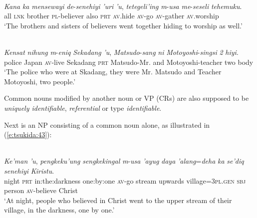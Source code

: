 \documentclass[output=paper
,modfonts
,nonflat]{langsci/langscibook}
\begin{document}
\begin{exe}
	\label{e:tsukida:41}\\
	\gll \textit{Kana} \textit{ka} \textit{mensewayi} \textit{de}-\textit{senehiyi} \textit{'uri} \textit{'u}, \textit{tetegeli'ing}   \textit{m}-\textit{usa}   \textit{me}-\textit{seseli} \textit{tehemuku}.\\
	all \textsc{lnk} brother \textsc{pl}-believer  also \textsc{prt} \textsc{av}.hide \textsc{av}-go \textsc{av}-gather \textsc{av}.worship\\
	\glt ‘The brothers and sisters of believers went together hiding to worship as well.’
\end{exe}

\begin{exe}
	\label{e:tsukida:42}\\
	\gll \textit{Kensat} \textit{nihung} \textit{m}-\textit{eniq}  \textit{Sekadang}  \textit{'u},  \textit{Matsudo}-\textit{sang}   \textit{ni}  \textit{Motoyoshi}-\textit{singsi}  \textit{2}   \textit{hiyi}.\\
	police Japan \textsc{av}-live Sekadang \textsc{prt} Matsudo-Mr. and Motoyoshi-teacher  two  body\\
	\glt ‘The  police who were at Skadang, they were Mr. Matsudo and Teacher Motoyoshi, two people.’
\end{exe}

\noindent
Common nouns modified by another noun or VP (CRs) are also supposed to be \textit{uniquely identifiable}, \textit{referential} or type \textit{identifiable}. 

Next is an NP consisting of a common noun alone, as illustrated in (\ref{e:tsukida:43}): 

\begin{exe}
	\label{e:tsukida:43}\\
	\gll \textit{Ke'man} \textit{'u}, \textit{pengkeku'ung} \textit{sengkekingal} \textit{m}-\textit{usa}  \textit{'ayug}  \textit{daya}  \textit{'alang}=\textit{deha}  \textit{ka}  \textit{se'diq}  \textit{senehiyi}  \textit{Kiristu}.\\
	night \textsc{prt} in:the:darkness  one:by:one \textsc{av}-go  stream  upwards  village=\textsc{3pl}.\textsc{gen} \textsc{sbj} person \textsc{av}-believe  Christ\\
	\glt ‘At night, people who believed in Christ went to the upper stream of their village, in the darkness, one by one.’
\end{exe}
\end{document}
